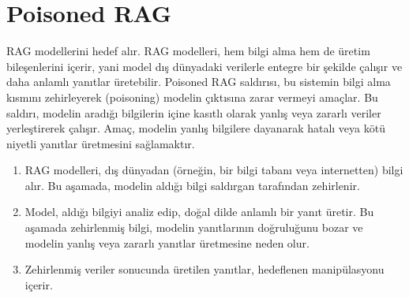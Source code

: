 \section{Poisoned RAG}

RAG modellerini hedef alır. RAG modelleri, hem bilgi alma hem de üretim bileşenlerini içerir, yani model dış dünyadaki verilerle entegre bir şekilde çalışır ve daha anlamlı yanıtlar üretebilir. Poisoned RAG saldırısı, bu sistemin bilgi alma kısmını zehirleyerek (poisoning) modelin çıktısına zarar vermeyi amaçlar. Bu saldırı, modelin aradığı bilgilerin içine kasıtlı olarak yanlış veya zararlı veriler yerleştirerek çalışır. Amaç, modelin yanlış bilgilere dayanarak hatalı veya kötü niyetli yanıtlar üretmesini sağlamaktır.

\begin{enumerate}
    \item RAG modelleri, dış dünyadan (örneğin, bir bilgi tabanı veya internetten) bilgi alır. Bu aşamada, modelin aldığı bilgi saldırgan tarafından zehirlenir.
    \item Model, aldığı bilgiyi analiz edip, doğal dilde anlamlı bir yanıt üretir. Bu aşamada zehirlenmiş bilgi, modelin yanıtlarının doğruluğunu bozar ve modelin yanlış veya zararlı yanıtlar üretmesine neden olur.
    \item Zehirlenmiş veriler sonucunda üretilen yanıtlar, hedeflenen manipülasyonu içerir.
\end{enumerate}

\newpage